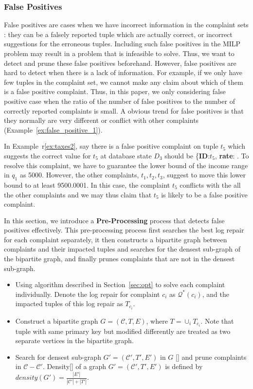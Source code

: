   \subsubsection{False Positives}
  False positives are cases when we have incorrect information in the complaint sets 
  : they can be a falsely reported tuple which are actually 
  correct, or incorrect suggestions for the erroneous tuples. 
  Including such false positives in the MILP problem may result in a problem
  that is infeasible to solve. Thus, we want to detect and prune these false positives 
  beforehand. However, false positives are hard to 
  detect when there is a lack of information. 
  For example, if we only have few tuples in the complaint
  set, we cannot make any claim about which of them is a false positive 
  complaint. Thus, in this paper, we only considering false positive
  case when the ratio of the number of false positives to the number
  of correctly reported complaints is small.
  A obvious trend for false positives is that they normally are very 
  different or conflict
  with other complaints (Example~\ref{ex:false_positive_1}).
  \begin{example} \label{ex:false_positive_1}
  In Example~r\ref{ex:taxes2}, say there is 
  a false positive complaint on tuple $t_5$ which suggests the correct value
  for $t_5$ at database state $D_3$ should be 
  \{\textbf{ID}:$t_5$, \textbf{rate}: \color{red}{30}
  \color{red}{\$1500}\color{black}{\}}. To resolve this complaint, we have
  to guarantee the lower bound of the income range in $q_1$ as 5000. 
  However, the other complaints, $t_1, t_2, t_3$, suggest to
  move this lower bound to at least 9500.0001. In this case, the complaint
  $t_5$ conflicts with the all the other complaints and we may thus
  claim that $t_5$ is likely to be a false positive complaint. 
  \end{example}
  In this section, we introduce a \textbf{Pre-Processing} process that detects 
  false positives effectively. This pre-processing process first searches the 
  best log repair for each complaint separately, it then constructs 
  a bipartite graph between complaints and their impacted tuples and
  searches for the densest sub-graph of the bipartite graph, and finally 
  prunes complaints that are not in the densest sub-graph.
  \begin{itemize}
  \item Using algorithm described in Section~\ref{sec:opt} to solve each 
  complaint individually. Denote the log repair for complaint $c_i$ 
  as $\mathcal{Q}^*(c_i)$, and the impacted tuples of this log repair as
  $T_{c_i}$.
  \item Construct a bipartite graph $G = (\mathcal{C}, T, E)$, where 
  $T = \cup_{i} T_{c_i}$. Note that tuple with same primary key but modified 
  differently are treated as two separate vertices in the bipartite graph. 
  \item Search for densest sub-graph $G' = (\mathcal{C}', T', E')$ in $G$ 
  []  and prune complaints in $\mathcal{C} - \mathcal{C}'$. 
  Density[] of a graph $G' = (\mathcal{C}', T', E')$
  is defined by $density(G') = \frac{|E'|}{|\mathcal{C}'|+|T'|}$. 
  \end{itemize}
